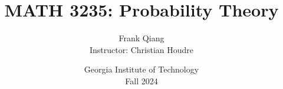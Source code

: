 \documentclass[12pt, letterpaper, oneside]{book}
\title{MATH 3235: Probability Theory}
\author{Frank Qiang\\Instructor: Christian Houdre}
\date{Georgia Institute of Technology\\Fall 2024}
\theoremstyle{definition}
\begin{document}
  \maketitle

  \begingroup
  \let\cleardoublepage\clearpage
  \tableofcontents
  \endgroup

  
  
  
  
  
  
  
  
  
\end{document}

